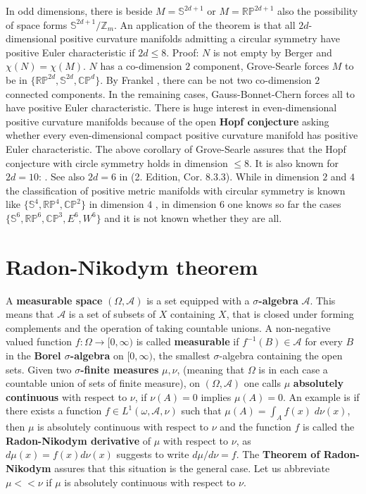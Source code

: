\documentclass[12pt]{amsart}
\newcounter{example}    \def\example#1{ \item \fontsize{12}{15} \selectfont #1 \fontsize{12}{15} \selectfont }
\begin{document}
In odd dimensions, there is beside $M=\mathbb{S}^{2d+1}$ or $M =\mathbb{RP}^{2d+1}$
also the possibility of space forms $\mathbb{S}^{2d+1}/\mathbb{Z}_m$.   
An application of the theorem is that all $2d$-dimensional positive curvature
manifolds admitting a circular symmetry have positive Euler characteristic if $2d \leq 8$.
Proof: $N$ is not empty by Berger and $\chi(N)=\chi(M)$. 
$N$ has a co-dimension $2$ component, Grove-Searle forces $M$ to be in
$\{ \mathbb{RP}^{2d},\mathbb{S}^{2d},\mathbb{CP}^d \}$. By Frankel \cite{Frankel1961}, 
there can be not two co-dimension $2$ connected components.
In the remaining cases, Gauss-Bonnet-Chern \cite{Chern1966} 
forces all to have positive Euler characteristic.
There is huge interest in even-dimensional positive curvature manifolds because of the
open {\bf Hopf conjecture}  \cite{Hopf1932,Hopf1946,Hopf1953,BishopGoldberg,BergerPanorama}
asking whether every even-dimensional compact positive
curvature manifold has positive Euler characteristic. The above corollary of Grove-Searle
assures that the Hopf conjecture with circle symmetry holds in dimension $\leq 8$.    
It is also known for $2d=10$: \cite{PuettmannSearle,RongSu2005,Wilking2003}.
See also $2d=6$ in \cite{Petersen3} (2. Edition, Cor. 8.3.3).
While in dimension $2$ and $4$ the classification of positive metric manifolds with  
circular symmetry is known like $\{ \mathbb{S}^4, \mathbb{RP}^4, \mathbb{CP}^2 \}$ in 
dimension $4$ \cite{HsiangKleiner}, in dimension $6$ one knows so far the cases      
$\{ \mathbb{S}^6, \mathbb{RP}^6, \mathbb{CP}^3, E^6,W^6 \}$ and it is not known whether
they are all. 


\section{Radon-Nikodym theorem}

A {\bf measurable space} $(\Omega,\mathcal{A})$ is a set equipped with
a {\bf $\sigma$-algebra} $\mathcal{A}$. This means that $\mathcal{A}$ is a
set of subsets of $X$ containing $X$, that is closed under forming complements
and the operation of taking countable unions. A non-negative valued function $f:\Omega \to [0,\infty)$
is called {\bf measurable} if $f^{-1}(B) \in \mathcal{A}$ for every $B$ in the
{\bf Borel $\sigma$-algebra} on $[0,\infty)$, the smallest $\sigma$-algebra 
containing the open sets. Given two {\bf $\sigma$-finite measures} $\mu,\nu$,
(meaning that $\Omega$ is in each case a countable union of sets of finite measure),
on $(\Omega,\mathcal{A})$ one calls $\mu$ {\bf absolutely continuous} with respect to $\nu$, if
$\nu(A)=0$ implies $\mu(A)=0$. An example is if there exists a function $f \in L^1(\omega,\mathcal{A},\nu)$
such that $\mu(A) = \int_A f(x) \; d\nu(x)$, then $\mu$ is absolutely continuous with respect to $\nu$
and the function $f$ is called the {\bf Radon-Nikodym derivative} of $\mu$ with respect to $\nu$,
as $d\mu(x)=f(x) d\nu(x)$ suggests to write $d\mu/d\nu = f$. The {\bf Theorem of Radon-Nikodym} assures
that this situation is the general case. 
Let us abbreviate $\mu << \nu$ if $\mu$ is absolutely continuous with respect to $\nu$.
\end{document}
